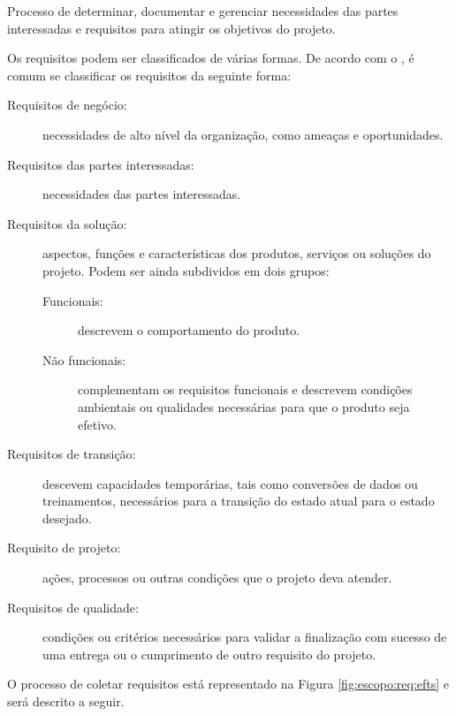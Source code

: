 
Processo de determinar, documentar e gerenciar necessidades das partes interessadas e requisitos para atingir os objetivos do projeto. 

Os requisitos podem ser classificados de várias formas. De acordo com o \bok, é comum se classificar os requisitos da seguinte forma:

\begin{description}
	
	\item[Requisitos de negócio:] necessidades de alto nível da organização, como ameaças e oportunidades.
	
	\item[Requisitos das partes interessadas:] necessidades das partes interessadas.
	
	\item[Requisitos da solução:] aspectos, funções e características dos produtos, serviços ou soluções do projeto. Podem ser ainda subdividos em dois grupos:
	
		\begin{description}
			
			\item[Funcionais:] descrevem o comportamento do produto.
			
			\item[Não funcionais:] complementam os requisitos funcionais e descrevem condições ambientais ou qualidades necessárias para que o produto seja efetivo.
			
		\end{description}
		
	\item[Requisitos de transição:] descevem capacidades temporárias, tais como conversões de dados ou treinamentos, necessários para a transição do estado atual para o estado desejado.
	
	\item[Requisito de projeto:] ações, processos ou outras condições que o projeto deva atender.
	
	\item[Requisitos de qualidade:] condições ou critérios necessários para validar a finalização com sucesso de uma entrega ou o cumprimento de outro requisito do projeto.
		
\end{description}
O processo de coletar requisitos está representado na Figura \ref{fig:escopo:req:efts} e será descrito a seguir.

